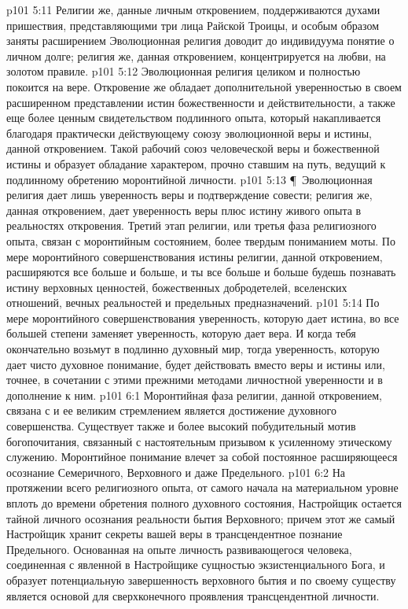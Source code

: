 \vs p101 5:11 Религии же, данные личным откровением, поддерживаются духами пришествия, представляющими три лица Райской Троицы, и особым образом заняты расширением  Эволюционная религия доводит до индивидуума понятие о личном долге; религия же, данная откровением, концентрируется на любви, на золотом правиле.
\vs p101 5:12 Эволюционная религия целиком и полностью покоится на вере. Откровение же обладает дополнительной уверенностью в своем расширенном представлении истин божественности и действительности, а также еще более ценным свидетельством подлинного опыта, который накапливается благодаря практически действующему союзу эволюционной веры и истины, данной откровением. Такой рабочий союз человеческой веры и божественной истины и образует обладание характером, прочно ставшим на путь, ведущий к подлинному обретению моронтийной личности.
\vs p101 5:13 \P\ Эволюционная религия дает лишь уверенность веры и подтверждение совести; религия же, данная откровением, дает уверенность веры плюс истину живого опыта в реальностях откровения. Третий этап религии, или третья фаза религиозного опыта, связан с моронтийным состоянием, более твердым пониманием моты. По мере моронтийного совершенствования истины религии, данной откровением, расширяются все больше и больше, и ты все больше и больше будешь познавать истину верховных ценностей, божественных добродетелей, вселенских отношений, вечных реальностей и предельных предназначений.
\vs p101 5:14 По мере моронтийного совершенствования уверенность, которую дает истина, во все большей степени заменяет уверенность, которую дает вера. И когда тебя окончательно возьмут в подлинно духовный мир, тогда уверенность, которую дает чисто духовное понимание, будет действовать вместо веры и истины или, точнее, в сочетании с этими прежними методами личностной уверенности и в дополнение к ним.
\vs p101 6:1 Моронтийная фаза религии, данной откровением, связана с  и ее великим стремлением является достижение духовного совершенства. Существует также и более высокий побудительный мотив богопочитания, связанный с настоятельным призывом к усиленному этическому служению. Моронтийное понимание влечет за собой постоянное расширяющееся осознание Семеричного, Верховного и даже Предельного.
\vs p101 6:2 На протяжении всего религиозного опыта, от самого начала на материальном уровне вплоть до времени обретения полного духовного состояния, Настройщик остается тайной личного осознания реальности бытия Верховного; причем этот же самый Настройщик хранит секреты вашей веры в трансцендентное познание Предельного. Основанная на опыте личность развивающегося человека, соединенная с явленной в Настройщике сущностью экзистенциального Бога, и образует потенциальную завершенность верховного бытия и по своему существу является основой для сверхконечного проявления трансцендентной личности.
